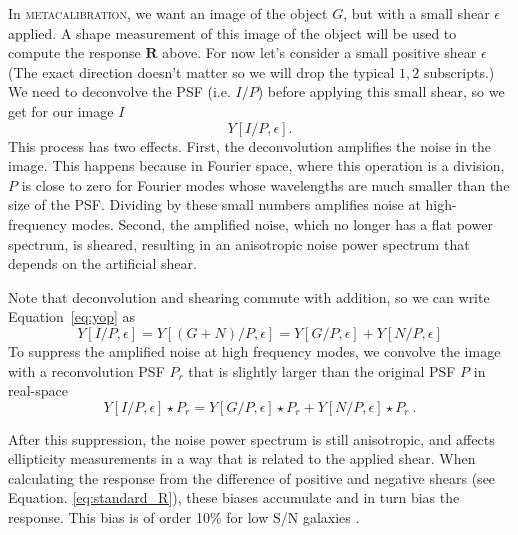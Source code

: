 \documentclass[twocolumn]{openjournal}
\makeatletter
\newcommand{\mcal}{\textsc{metacalibration}\@\xspace}
\makeatother
\begin{document}
In \mcal, we want an image of the object $G$, but with a small shear $\epsilon$ applied.
A shape measurement of this image of the object will be used to compute the response
$\mathbf{R}$ above. For now let's consider a small positive shear $\epsilon$
(The exact direction doesn't matter so we will drop the typical $1,2$
subscripts.) We need to deconvolve the PSF (i.e. $I/P$) before applying this small
shear, so we get for our image $I$
\begin{equation} \label{eq:yop}
Y[I/P,\epsilon].
\end{equation}
This process has two effects. First, the deconvolution amplifies the noise in the
image. This happens because in Fourier space, where this operation is a division, $P$ is
close to zero for Fourier modes whose wavelengths are much smaller than the size of the
PSF. Dividing by these small numbers amplifies noise at high-frequency modes. Second,
the amplified noise, which no longer has a flat power spectrum, is sheared, resulting
in an anisotropic noise power spectrum that depends on the artificial
shear.

Note that deconvolution and shearing commute with addition, so we can write
Equation~\ref{eq:yop} as
\begin{equation*}
Y[I/P,\epsilon] = Y[(G+N)/P,\epsilon] = Y[G/P,\epsilon] + Y[N/P,\epsilon]
\end{equation*}
To suppress the amplified noise at high frequency modes, we convolve the image
with a reconvolution PSF $P_r$ that is
slightly larger than the original PSF $P$ in real-space
\begin{equation} \label{eq:dilate}
Y[I/P,\epsilon]\star P_r = Y[G/P,\epsilon]\star P_r + Y[N/P,\epsilon]\star P_r\ .
\end{equation}

After this suppression, the noise power spectrum is still anisotropic, and
affects ellipticity measurements in a way that is related to the applied
shear.  When calculating the response from the difference of
positive and negative shears (see Equation. \ref{eq:standard_R}), these biases
accumulate and in turn bias the response.
This bias is of order 10\% for low S/N galaxies \citep{SheldonMcal2017}.
\end{document}
